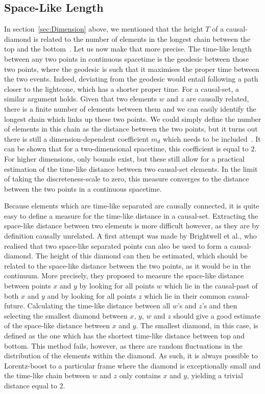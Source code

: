 \documentclass[a4paper,12pt]{article}
\numberwithin{equation}{section}
\begin{document}
\subsection{Space-Like Length}
\label{sec:Space-Like Length}

In section~\ref{sec:Dimension} above, we mentioned that the height $T$ of a causal-diamond is related to the number of elements in the longest chain between the top and the bottom~\cite{Meyer1988}. Let us now make that more precise. The time-like length between any two points in continuous spacetime is the geodesic between those two points, where the geodesic is such that it maximises the proper time between the two events. Indeed, deviating from the geodesic would entail following a path closer to the lightcone, which has a shorter proper time. For a causal-set, a similar argument holds. Given that two elements $w$ and $z$ are causally related, there is a finite number of elements between them and we can easily identify the longest chain which links up these two points. We could simply define the number of elements in this chain as the distance between the two points, but it turns out there is still a dimension-dependent coefficient $m_d$ which needs to be included~\cite{Brightwell1991}. It can be shown that for a two-dimensional spacetime, this coefficient is equal to $2$. For higher dimensions, only bounds exist, but these still allow for a practical estimation of the time-like distance between two causal-set elements. In the limit of taking the discreteness-scale to zero, this measure converges to the distance between the two points in a continuous spacetime.

Because elements which are time-like separated are causally connected, it is quite easy to define a measure for the time-like distance in a causal-set. Extracting the space-like distance between two elements is more difficult however, as they are by definition causally unrelated. A first attempt was made by Brightwell et al., who realised that two space-like separated points can also be used to form a causal-diamond. The height of this diamond can then be estimated, which should be related to the space-like distance between the two points, as it would be in the continuum. More precisely, they proposed to measure the space-like distance between points $x$ and $y$ by looking for all points $w$ which lie in the causal-past of both $x$ and $y$ and by looking for all points $z$ which lie in their common causal-future. Calculating the time-like distance between all $w$'s and $z$'s and then selecting the smallest diamond between $x$, $y$, $w$ and $z$ should give a good estimate of the space-like distance between $x$ and $y$. The smallest diamond, in this case, is defined as the one which has the shortest time-like distance between top and bottom. This method fails, however, as there are random fluctuations in the distribution of the elements within the diamond. As such, it is always possible to Lorentz-boost to a particular frame where the diamond is exceptionally small and the time-like chain between $w$ and $z$ only contains $x$ and $y$, yielding a trivial distance equal to $2$.
\end{document}
